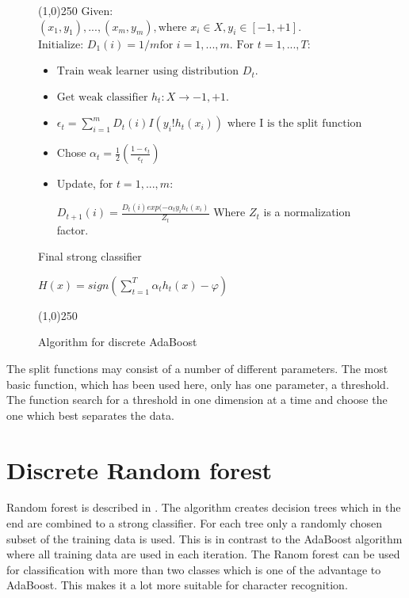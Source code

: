 \begin{figure} [H]
\line(1,0){250} \newline
Given: $(x_1,y_1),...,(x_m,y_m), \text{where } x_i\in X, y_i \in [-1,+1]$. \newline
$\text{Initialize: } D_1(i)=1/m \text{for } i=1,...,m.$ \newline \newline
$\text{For } t=1,...,T:$
\begin{itemize}
\item $\text{Train weak learner using distribution } D_t.$
\item $\text{Get weak classifier } h_t : X \to {-1,+1}$.
\item {}
\begin{center} 

	$\epsilon_t = \sum_{i=1}^{m} D_t(i)I(y_i ! h_t(x_i))$ \newline
	$\text{where I is the split function}$ \newline
\end{center}
\item Chose $ \alpha_t = \frac{1}{2}(\frac{1-\epsilon_t}{\epsilon_t})$
\item Update, for $t = 1,...,m:$
\begin{center} 

	$D_{t+1}(i) = \frac{D_t(i)exp(-\alpha_ty_ih_t(x_i)}{Z_t}$ \newline
	Where $Z_t$ is a normalization factor. \newline
\end{center}
\end{itemize}
Final strong classifier
\begin{center}
	$ H(x) = sign(\sum_{t=1}^{T} {\alpha_th_t(x)}-\varphi)$
\end{center}
\line(1,0){250}
\caption{Algorithm for discrete AdaBoost}
\label{AdaBoost}
\end{figure}


The split functions may consist of a number of different parameters. The most basic function, which has been used here, only has one parameter, a threshold. The function search for a threshold in one dimension at a time and choose the one which best separates the data.

\section{Discrete Random forest}
\label{sec:Discret Random forest}
Random forest is described in \citep{Criministi:2011}. The algorithm creates decision trees which in the end are combined to a strong classifier. For each tree only a randomly chosen subset of the training data is used. This is in contrast to the AdaBoost algorithm where all training data are used in each iteration. The Ranom forest can be used for classification with more than two classes which is one of the advantage to AdaBoost. This makes it a lot more suitable for character recognition.

